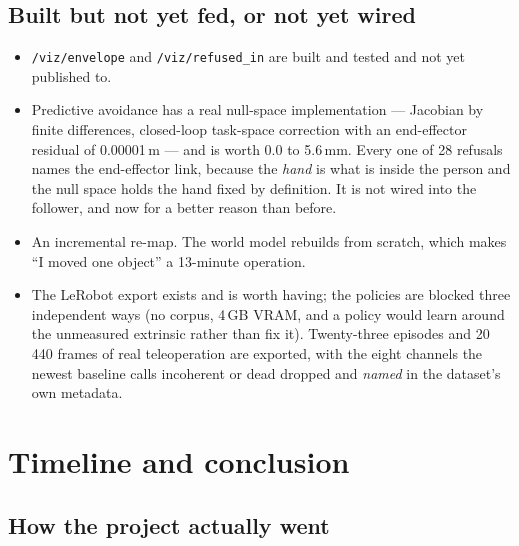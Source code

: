\documentclass[11pt,a4paper,oneside]{report}
\newcommand{\code}[1]{\texttt{\small #1}}
\begin{document}
\section{Built but not yet fed, or not yet wired}

\begin{itemize}
\item \code{/viz/envelope} and \code{/viz/refused\_in} are built and tested and
      not yet published to.
\item Predictive avoidance has a real null-space implementation --- Jacobian by
      finite differences, closed-loop task-space correction with an
      end-effector residual of 0.00001\,m --- and is worth 0.0 to 5.6\,mm.
      Every one of 28 refusals names the end-effector link, because the
      \emph{hand} is what is inside the person and the null space holds the
      hand fixed by definition. It is not wired into the follower, and now for a
      better reason than before.
\item An incremental re-map. The world model rebuilds from scratch, which makes
      ``I moved one object'' a 13-minute operation.
\item The LeRobot export exists and is worth having; the policies are blocked
      three independent ways (no corpus, 4\,GB VRAM, and a policy would learn
      around the unmeasured extrinsic rather than fix it). Twenty-three episodes
      and 20\,440 frames of real teleoperation are exported, with the eight
      channels the newest baseline calls incoherent or dead dropped and
      \emph{named} in the dataset's own metadata.
\end{itemize}

\chapter{Timeline and conclusion}

\section{How the project actually went}
\end{document}
